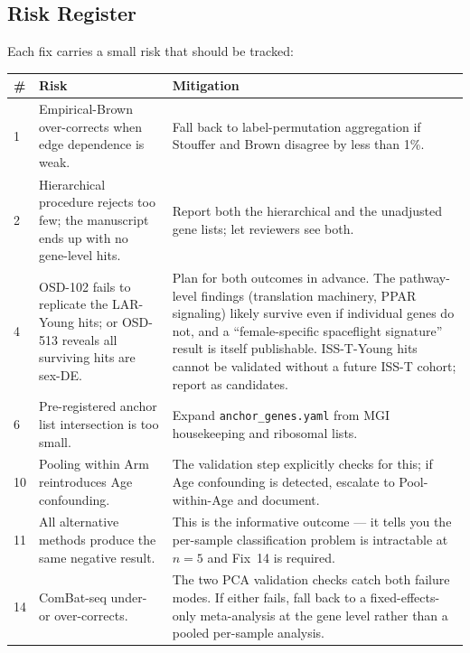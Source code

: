 \documentclass[11pt]{article}
\newcommand{\code}[1]{\texttt{#1}}
\begin{document}
\subsection{Risk Register}

Each fix carries a small risk that should be tracked:

\begin{center}
\small
\begin{tabular}{p{}p{}p{}}
\toprule
\textbf{\#} & \textbf{Risk} & \textbf{Mitigation} \\
\midrule
1 & Empirical-Brown over-corrects when edge dependence is weak. & Fall back to label-permutation aggregation if Stouffer and Brown disagree by less than 1\%. \\
2 & Hierarchical procedure rejects too few; the manuscript ends up with no gene-level hits. & Report both the hierarchical and the unadjusted gene lists; let reviewers see both. \\
4 & OSD-102 fails to replicate the LAR-Young hits; or OSD-513 reveals all surviving hits are sex-DE. & Plan for both outcomes in advance. The pathway-level findings (translation machinery, PPAR signaling) likely survive even if individual genes do not, and a ``female-specific spaceflight signature'' result is itself publishable. ISS-T-Young hits cannot be validated without a future ISS-T cohort; report as candidates. \\
6 & Pre-registered anchor list intersection is too small. & Expand \code{anchor\_genes.yaml} from MGI housekeeping and ribosomal lists. \\
10 & Pooling within Arm reintroduces Age confounding. & The validation step explicitly checks for this; if Age confounding is detected, escalate to Pool-within-Age and document. \\
11 & All alternative methods produce the same negative result. & This is the informative outcome --- it tells you the per-sample classification problem is intractable at $n{=}5$ and Fix~14 is required. \\
14 & ComBat-seq under- or over-corrects. & The two PCA validation checks catch both failure modes. If either fails, fall back to a fixed-effects-only meta-analysis at the gene level rather than a pooled per-sample analysis. \\
\bottomrule
\end{tabular}
\end{center}

\end{document}
